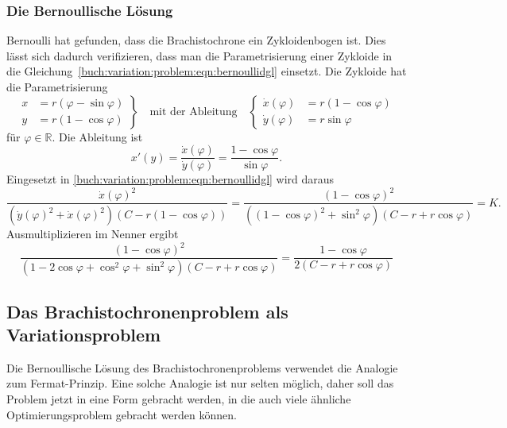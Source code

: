 \subsubsection{Die Bernoullische Lösung}
Bernoulli hat gefunden, dass die Brachistochrone ein Zykloidenbogen ist.
Dies lässt sich dadurch verifizieren, dass man die Parametrisierung
einer Zykloide in die
Gleichung~\eqref{buch:variation:problem:eqn:bernoullidgl}
einsetzt.
Die Zykloide hat die Parametrisierung
\[
\left.
\begin{aligned}
x &= r(\varphi - \sin\varphi) 
\\
y &= r(1-\cos\varphi)
\end{aligned}
\right\}
\quad
\text{mit der Ableitung}
\quad
\left\{
\begin{aligned}
\dot{x}(\varphi) &= r(1-\cos\varphi)\\
\dot{y}(\varphi) &= r\sin\varphi
\end{aligned}
\right.
\]
für $\varphi\in\mathbb{R}$.
Die Ableitung ist
\[
x'(y)
=
\frac{\dot{x}(\varphi)}{\dot{y}(\varphi)}
=
\frac{1-\cos\varphi}{\sin\varphi}.
\]
Eingesetzt in \eqref{buch:variation:problem:eqn:bernoullidgl}
wird daraus
\[
\frac{\dot{x}(\varphi)^2}{
(\dot{y}(\varphi)^2 +\dot{x}(\varphi)^2)
(C-r(1-\cos\varphi))
}
=
\frac{(1-\cos\varphi)^2}{
((1-\cos\varphi)^2+\sin^2\varphi)
(C-r+r\cos\varphi)
}
=
K.
\]
Ausmultiplizieren im Nenner ergibt
\[
\frac{(1-\cos\varphi)^2}{
(1-2\cos\varphi+\cos^2\varphi+\sin^2\varphi)
(C-r+r\cos\varphi)
}
=
\frac{1-\cos\varphi}{
2(C-r+r\cos\varphi)
}
\]

%
%
\subsection{Das Brachistochronenproblem als Variationsproblem}
Die Bernoullische Lösung des Brachistochronenproblems verwendet die
Analogie zum Fermat-Prinzip.
Eine solche Analogie ist nur selten möglich, daher soll das Problem
jetzt in eine Form gebracht werden, in die auch viele ähnliche
Optimierungsproblem gebracht werden können.


